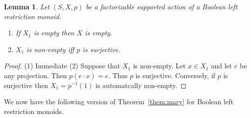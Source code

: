 \documentclass[a4paper]{amsart}
\newtheorem{lemma}[theorem]{Lemma}
\begin{document}
\begin{lemma} Let $(S,X,p)$ be a factorizable supported action of a Boolean left restriction monoid.
\begin{enumerate}
\item If $X_{1}$ is empty then $X$ is empty.
\item $X_{1}$ is non-empty  iff $p$ is surjective.
\end{enumerate}
\end{lemma}
\begin{proof} (1) Immediate
(2) Suppose that $X_{1}$ is non-empty.
Let $x \in X_{1}$ and let $e$ be any projection.
Then $p(e \cdot x) = e$.
Thus $p$ is surjective.
Conversely, if $p$ is surjective then $X_{1} = p^{-1}(1)$ is automatcally non-empty.
\end{proof}


We now have the following version of Theorem~\ref{them:mary} for Boolean left restriction monoids.
\end{document}
